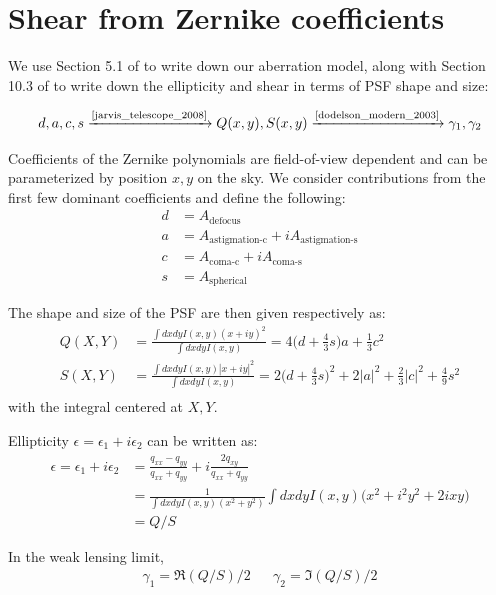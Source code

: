 \section{Shear from Zernike coefficients} \label{sec:ell_zernike} 

We use Section 5.1 of \cite{jarvis_telescope_2008} to write down our aberration model, along with Section 10.3 of \cite{dodelson_modern_2003} to write down the ellipticity and shear in terms of PSF shape and size: 

\begin{equation}
d, a, c, s \xrightarrow{\text{\cite{jarvis_telescope_2008}}} Q(x, y), S(x, y) \xrightarrow{\text{\cite{dodelson_modern_2003}}} \gamma_1, \gamma_2
\end{equation}

Coefficients of the Zernike polynomials are field-of-view dependent and can be parameterized by position $x, y$ on the sky. We consider contributions from the first few dominant coefficients and define the following:
\begin{align}
d &= A_\text{defocus} \\
a &= A_\text{astigmation-c} + i A_\text{astigmation-s} \\
c &= A_\text{coma-c} + i A_\text{coma-s} \\
s &= A_\text{spherical}
\end{align}

The shape and size of the PSF are then given respectively as:
\begin{align}
Q(X, Y) &= \frac{\int dx dy I(x, y) (x+iy)^2}{\int dx dy I(x, y)} = 4 \Big(d+\frac{4}{3}s \Big) a + \frac{1}{3} c^2\\
S(X, Y) &= \frac{\int dx dy I(x, y) |x+iy|^2}{\int dx dy I(x, y)} = 2 \Big(d+\frac{4}{3}s \Big)^2 + 2 |a|^2 + \frac{2}{3} |c|^2 + \frac{4}{9} s^2\\
\end{align}
with the integral centered at $X, Y$. 

Ellipticity $\epsilon = \epsilon_1 + i \epsilon_2$ can be written as:
\begin{align}
\epsilon = \epsilon_1 + i \epsilon_2 &= \frac{q_{xx} - q_{yy}}{q_{xx} + q_{yy}} + i \frac{2 q_{xy}}{q_{xx} + q_{yy}}\\
&= \frac{1}{\int dx dy I(x, y) (x^2 + y^2)} \int dx dy I(x, y) \Big( x^2 + i^2 y^2 + 2ixy \Big) \\
&= Q \Big/ S
\end{align}

In the weak lensing limit, 
\begin{align}
\gamma_1 = \Re(Q / S) \Big/ 2 && \gamma_2 = \Im(Q / S) \Big/ 2
\end{align}

